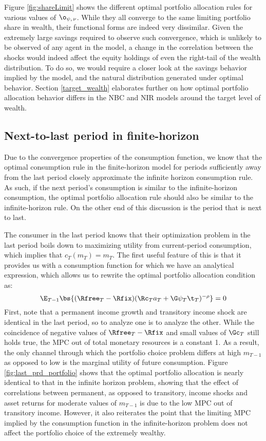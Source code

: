 Figure \ref{fig:shareLimit} shows the different optimal portfolio allocation rules for various values of $\o_{\psi,\,\nu}$. While they all converge to the same limiting portfolio share in wealth, their functional forms are indeed very dissimilar. Given the extremely large savings required to observe such convergence, which is unlikely to be observed of any agent in the model, a change in the correlation between the shocks would indeed affect the equity holdings of even the right-tail of the wealth distribution. To do so, we would require a closer look at the savings behavior implied by the model, and the natural distribution generated under optimal behavior. Section \ref{target_wealth} elaborates further on how optimal portfolio allocation behavior differs in the NBC and NIR models around the target level of wealth.

\subsection{Next-to-last period in finite-horizon}\label{finite_horizon}

Due to the convergence properties of the consumption function, we know that the optimal consumption rule in the finite-horizon model for periods sufficiently away from the last period closely approximate the infinite horizon consumption rule. As such, if the next period's consumption is similar to the infinite-horizon consumption, the optimal portfolio allocation rule should also be similar to the infinite-horizon rule. On the other end of this discussion is the period that is next to last.

The consumer in the last period knows that their optimization problem in the last period boils down to maximizing utility from current-period consumption, which implies that $c_T(m_T) = m_T$. The first useful feature of this is that it provides us with a consumption function for which we have an analytical expression, which allows us to rewrite the optimal portfolio allocation condition as:
\[
\E_{T-1}\bs{(\Rfree_{T} - \Rfix)(\Rc_{T}a_{T} + \G\psi_{T}\t_{T})^{-\rho}} = 0
\]
First, note that a permanent income growth and transitory income shock are identical in the last period, so to analyze one is to analyze the other. While the coincidence of negative values of $\Rfree_{T} - \Rfix$ and small values of $\Gc_{T}$ still holds true, the MPC out of total monetary resources is a constant 1. As a result, the only channel through which the portfolio choice problem differs at high $m_{T-1}$ as opposed to low is the marginal utility of future consumption. Figure \ref{fig:last_prd_portfolio} shows that the optimal portfolio allocation is nearly identical to that in the infinite horizon problem, showing that the effect of correlations between permanent, as opposed to transitory, income shocks and asset returns for moderate values of $m_{T-1}$ is due to the low MPC out of transitory income. However, it also reiterates the point that the limiting MPC implied by the consumption function in the infinite-horizon problem does not affect the portfolio choice of the extremely wealthy.

